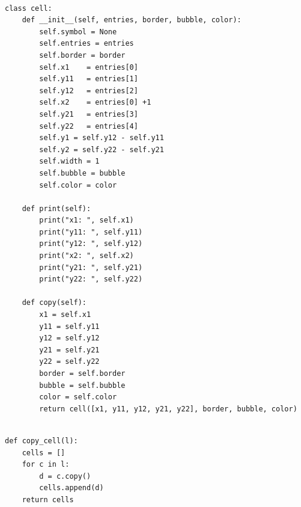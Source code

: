 \documentclass{book}
\newcounter{pcounter}
\begin{document}
\begin{center}
\begin{tcolorbox}[width=5in,colback={white},title={\begin{center}\texttt{Python \thepcounter} \addtocounter{pcounter}{1}  \end{center}},colbacktitle=Red,coltitle=black]
\begin{verbatim}

class cell:
    def __init__(self, entries, border, bubble, color):
        self.symbol = None
        self.entries = entries
        self.border = border
        self.x1    = entries[0]
        self.y11   = entries[1]
        self.y12   = entries[2]
        self.x2    = entries[0] +1
        self.y21   = entries[3]
        self.y22   = entries[4]
        self.y1 = self.y12 - self.y11
        self.y2 = self.y22 - self.y21
        self.width = 1
        self.bubble = bubble
        self.color = color

    def print(self):
        print("x1: ", self.x1)
        print("y11: ", self.y11)
        print("y12: ", self.y12)
        print("x2: ", self.x2)
        print("y21: ", self.y21)
        print("y22: ", self.y22)

    def copy(self):
        x1 = self.x1
        y11 = self.y11
        y12 = self.y12
        y21 = self.y21
        y22 = self.y22
        border = self.border
        bubble = self.bubble
        color = self.color
        return cell([x1, y11, y12, y21, y22], border, bubble, color)

\end{verbatim}%
\end{tcolorbox}
\end{center}

\begin{center}
\begin{tcolorbox}[width=5in,colback={white},title={\begin{center}\texttt{Python \thepcounter} \addtocounter{pcounter}{1}  \end{center}},colbacktitle=Red,coltitle=black]
\begin{verbatim}

def copy_cell(l):
    cells = []
    for c in l:
        d = c.copy()
        cells.append(d)
    return cells

\end{verbatim}%
\end{tcolorbox}
\end{center}
\end{document}
